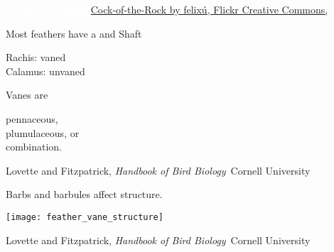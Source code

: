 \documentclass[t]{beamer}
\begin{document}

{
\begin{frame}[b,plain]{\textcolor{white}{Feathers and flight}}
	\tiny \hspace{4em}\textcolor{cotr}{\href{https://www.flickr.com/photos/24201429@N04/13995876801}{Cock-of-the-Rock by felixú, Flickr Creative Commons, }}
\end{frame}
}


{

\begin{frame}[t,plain]{Most feathers have a  and }
	\hangpara Shaft
	
	\quad Rachis: vaned \\
	\quad Calamus: unvaned
	
	\hangpara Vanes are
	
	\quad pennaceous,\\
	\quad plumulaceous, or\\
	\quad combination.
	
	\vfilll
	
	\tiny Lovette and Fitzpatrick, \textit{Handbook of Bird Biology} \textcopyright\,Cornell University
\end{frame}
}

{
\begin{frame}[t,plain]{Barbs and barbules affect structure.}

	\vspace{-\baselineskip}
	
	\centering
	
	\texttt{[image: feather\_vane\_structure]}
	
	\tiny \hfill Lovette and Fitzpatrick, \textit{Handbook of Bird Biology} \textcopyright\,Cornell University
\end{frame}
}
\end{document}
